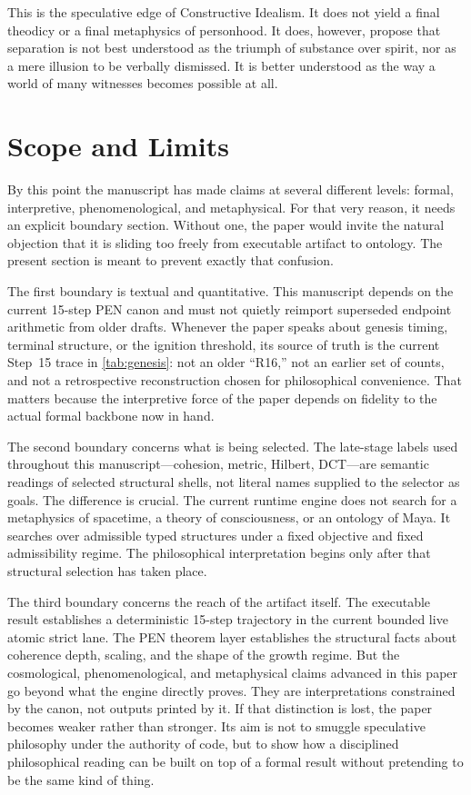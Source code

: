 \documentclass[11pt,a4paper]{article}
\theoremstyle{plain}
\theoremstyle{definition}
\theoremstyle{remark}
\begin{document}
This is the speculative edge of Constructive Idealism.
It does not yield a final theodicy or a final metaphysics of personhood.
It does, however, propose that separation is not best understood as the triumph of substance over spirit, nor as a mere illusion to be verbally dismissed.
It is better understood as the way a world of many witnesses becomes possible at all.

\section{Scope and Limits}
\label{sec:limits}

By this point the manuscript has made claims at several different levels: formal, interpretive, phenomenological, and metaphysical.
For that very reason, it needs an explicit boundary section.
Without one, the paper would invite the natural objection that it is sliding too freely from executable artifact to ontology.
The present section is meant to prevent exactly that confusion.

The first boundary is textual and quantitative.
This manuscript depends on the current 15-step PEN canon and must not quietly reimport superseded endpoint arithmetic from older drafts.
Whenever the paper speaks about genesis timing, terminal structure, or the ignition threshold, its source of truth is the current Step~15 trace in \cref{tab:genesis}: not an older ``R16,'' not an earlier set of counts, and not a retrospective reconstruction chosen for philosophical convenience.
That matters because the interpretive force of the paper depends on fidelity to the actual formal backbone now in hand.

The second boundary concerns what is being selected.
The late-stage labels used throughout this manuscript---cohesion, metric, Hilbert, DCT---are semantic readings of selected structural shells, not literal names supplied to the selector as goals.
The difference is crucial.
The current runtime engine does not search for a metaphysics of spacetime, a theory of consciousness, or an ontology of Maya.
It searches over admissible typed structures under a fixed objective and fixed admissibility regime.
The philosophical interpretation begins only after that structural selection has taken place.

The third boundary concerns the reach of the artifact itself.
The executable result establishes a deterministic 15-step trajectory in the current bounded live atomic strict lane.
The PEN theorem layer establishes the structural facts about coherence depth, scaling, and the shape of the growth regime.
But the cosmological, phenomenological, and metaphysical claims advanced in this paper go beyond what the engine directly proves.
They are interpretations constrained by the canon, not outputs printed by it.
If that distinction is lost, the paper becomes weaker rather than stronger.
Its aim is not to smuggle speculative philosophy under the authority of code, but to show how a disciplined philosophical reading can be built on top of a formal result without pretending to be the same kind of thing.
\end{document}
